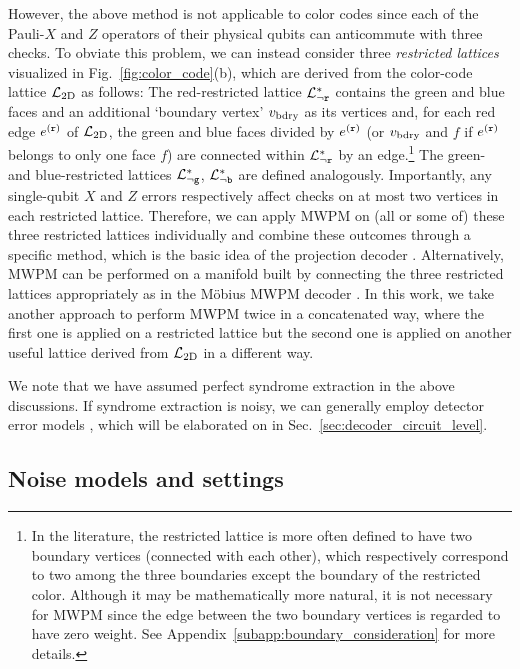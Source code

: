 \documentclass[a4paper,twocolumn,11pt,accepted=2025-01-21]{quantumarticle}
\theoremstyle{definition}
\theoremstyle{definition}
\theoremstyle{definition}
\begin{document}
However, the above method is not applicable to color codes since each of the Pauli-$X$ and $Z$ operators of their physical qubits can anticommute with three checks.
To obviate this problem, we can instead consider three \emph{restricted lattices} visualized in Fig.~\ref{fig:color_code}(b), which are derived from the color-code lattice $\mathcal{L}_{\mathrm{2D}}$ as follows:
The red-restricted lattice $\mathcal{L}_{\neg \texttt{r}}^*$ contains the green and blue faces and an additional `boundary vertex' $v_{\mathrm{bdry}}$ as its vertices and, for each red edge $e^{(\texttt{r})}$ of $\mathcal{L}_{\mathrm{2D}}$, the green and blue faces divided by $e^{(\texttt{r})}$ (or $v_{\mathrm{bdry}}$ and $f$ if $e^{(\texttt{r})}$ belongs to only one face $f$) are connected within $\mathcal{L}_{\neg \texttt{r}}^*$ by an edge.\footnote{In the literature, the restricted lattice is more often defined to have two boundary vertices (connected with each other), which respectively correspond to two among the three boundaries except the boundary of the restricted color. Although it may be mathematically more natural, it is not necessary for MWPM since the edge between the two boundary vertices is regarded to have zero weight. See Appendix~\ref{subapp:boundary_consideration} for more details.}
The green- and blue-restricted lattices $\mathcal{L}_{\neg \texttt{g}}^*$, $\mathcal{L}_{\neg \texttt{b}}^*$ are defined analogously.
Importantly, any single-qubit $X$ and $Z$ errors respectively affect checks on at most two vertices in each restricted lattice.
Therefore, we can apply MWPM on (all or some of) these three restricted lattices individually and combine these outcomes through a specific method, which is the basic idea of the projection decoder \cite{delfosse2014decoding}.
Alternatively, MWPM can be performed on a manifold built by connecting the three restricted lattices appropriately as in the Möbius MWPM decoder \cite{sahay2022decoder}.
In this work, we take another approach to perform MWPM twice in a concatenated way, where the first one is applied on a restricted lattice but the second one is applied on another useful lattice derived from $\mathcal{L}_{\mathrm{2D}}$ in a different way.

We note that we have assumed perfect syndrome extraction in the above discussions.
If syndrome extraction is noisy, we can generally employ detector error models \cite{gidney2021stim}, which will be elaborated on in Sec.~\ref{sec:decoder_circuit_level}.

\subsection{Noise models and settings \label{subsec:settings}}
\end{document}
